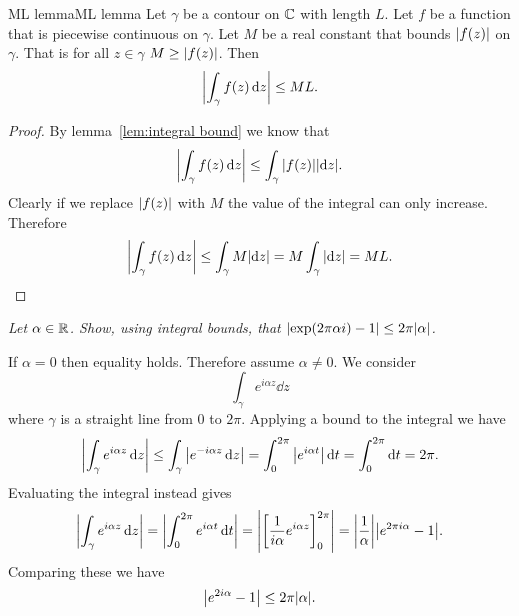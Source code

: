 \documentclass{article}
\begin{document}
    \begin{lemma}{ML lemma}{ML lemma}
        Let \(\gamma\) be a contour on \(\mathbb{C}\) with length \(L\).
        Let \(f\) be a function that is piecewise continuous on \(\gamma\).
        Let \(M\) be a real constant that bounds \(\abs{f(z)}\) on \(\gamma\).
        That is for all \(z\in\gamma\) \(M \ge \abs{f(z)}\).
        Then
        \[\abs{\int_\gamma f(z)\dd{z}} \le ML.\]
    \end{lemma}
    \begin{proof}
        By lemma~\ref{lem:integral bound} we know that
        \[\abs{\int_\gamma f(z)\dd{z}} \le \int_{\gamma} \abs{f(z)} \abs{\dd{z}}.\]
        Clearly if we replace \(\abs{f(z)}\) with \(M\) the value of the integral can only increase.
        Therefore
        \[\abs{\int_\gamma f(z)\dd{z}} \le \int_{\gamma} M\abs{\dd{z}} = M\int_{\gamma} \abs{\dd{z}} = ML.\]
    \end{proof}
    
    \begin{example}
        \textit{Let \(\alpha\in\mathbb{R}\). Show, using integral bounds, that \(\abs{\exp(2\pi\alpha i) - 1} \le 2\pi\abs{\alpha}\).}
        
        If \(\alpha = 0\) then equality holds.
        Therefore assume \(\alpha \ne 0\).
        We consider
        \[\int_{\gamma}e^{i\alpha z}\dd{z}\]
        where \(\gamma\) is a straight line from \(0\) to \(2\pi\).
        Applying a bound to the integral we have
        \[\abs{\int_{\gamma} e^{i\alpha z}\dd{z}} \le \int_{\gamma} \abs{e^{-i\alpha z}\dd{z}} = \int_0^{2\pi} \abs{e^{i\alpha t}}\dd{t} = \int_0^{2\pi}\dd{t} = 2\pi.\]
        Evaluating the integral instead gives
        \[\abs{\int_{\gamma} e^{i\alpha z}\dd{z}} = \abs{\int_0^{2\pi} e^{i\alpha t}\dd{t}} = \abs{\left[\frac{1}{i\alpha} e^{i\alpha z}\right]_0^{2\pi}} = \abs{\frac{1}{\alpha}}\abs{e^{2\pi i\alpha} - 1}.\]
        Comparing these we have
        \[\abs{e^{2i\alpha} - 1} \le 2\pi\abs{\alpha}.\]
    \end{example}
    
\end{document}
